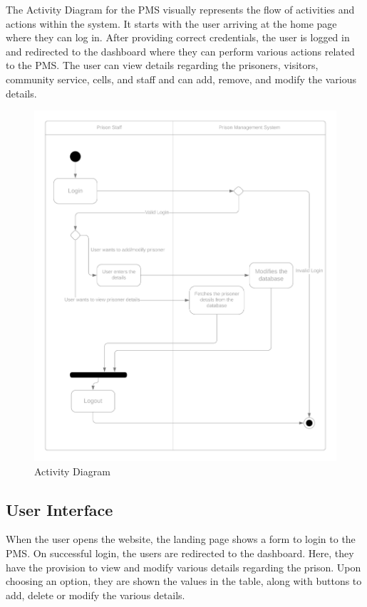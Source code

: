     The Activity Diagram for the  PMS visually represents the flow of activities and actions within the system. It starts with the user arriving at the home page where they can log in. After providing correct credentials, the user is logged in and redirected to the dashboard where they can perform various actions related to the PMS. The user can view details regarding the prisoners, visitors, community service, cells, and staff and can add, remove, and modify the various details.
    \begin{figure}[H]
        \centering
        \includegraphics[scale=0.4, width=\textwidth]{activity.png}
        \caption{Activity Diagram}
        \label{fig:activity}
    \end{figure}
\subsection{User Interface}
    When the user opens the website, the landing page shows a form to login to the PMS. On successful login, the users are redirected to the dashboard. Here, they have the provision to view and modify various details regarding the prison. Upon choosing an option, they are shown the values in the table, along with buttons to add, delete or modify the various details.
    
